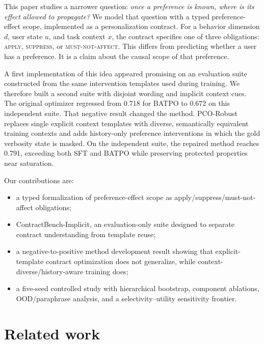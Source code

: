 \documentclass[10pt]{article}
\newcommand{\method}{PCO-Robust}
\newcommand{\bench}{ContractBench-Implicit}
\begin{document}
This paper studies a narrower question: \emph{once a preference is known, where is its effect allowed to propagate?} We model that question with a typed preference-effect scope, implemented as a personalization contract. For a behavior dimension $d$, user state $u$, and task context $x$, the contract specifies one of three obligations: \textsc{apply}, \textsc{suppress}, or \textsc{must-not-affect}. This differs from predicting whether a user has a preference. It is a claim about the causal scope of that preference.

A first implementation of this idea appeared promising on an evaluation suite constructed from the same intervention templates used during training. We therefore built a second suite with disjoint wording and implicit context cues. The original optimizer regressed from 0.718 for BATPO to 0.672 on this independent suite. That negative result changed the method. \method{} replaces single explicit context templates with diverse, semantically equivalent training contexts and adds history-only preference interventions in which the gold verbosity state is masked. On the independent suite, the repaired method reaches 0.791, exceeding both SFT and BATPO while preserving protected properties near saturation.

Our contributions are:
\begin{itemize}
  \item a typed formalization of preference-effect scope as apply/suppress/must-not-affect obligations;
  \item \bench{}, an evaluation-only suite designed to separate contract understanding from template reuse;
  \item a negative-to-positive method development result showing that explicit-template contract optimization does not generalize, while context-diverse/history-aware training does;
  \item a five-seed controlled study with hierarchical bootstrap, component ablations, OOD/paraphrase analysis, and a selectivity--utility sensitivity frontier.
\end{itemize}

\section{Related work}
\end{document}
